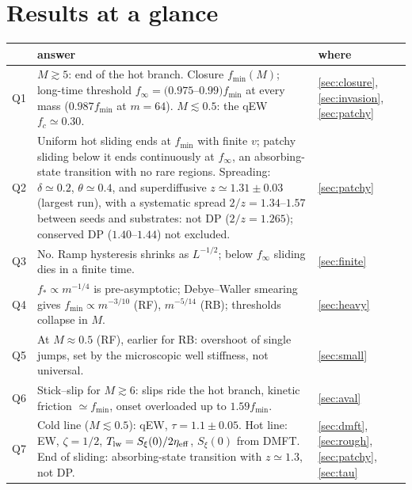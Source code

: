 \documentclass[10pt,a4paper]{article}
\newcommand{\fcs}{f_c}
\begin{document}
\section{Results at a glance}
\label{sec:glance}

\begin{center}\small
\begin{tabular}{p{0.6cm}p{11.2cm}p{2.6cm}}
\toprule
 & answer & where \\
\midrule
Q1 & $M\gtrsim5$: end of the hot branch. Closure $f_{\min}(M)$; long-time threshold $f_\infty=(0.975$--$0.99)f_{\min}$ at every mass ($0.987f_{\min}$ at $m=64$). $M\lesssim0.5$: the qEW $\fcs\simeq0.30$. & \ref{sec:closure}, \ref{sec:invasion}, \ref{sec:patchy} \\
Q2 & Uniform hot sliding ends at $f_{\min}$ with finite $v$; patchy sliding below it ends continuously at $f_\infty$, an absorbing-state transition with no rare regions. Spreading: $\delta\simeq0.2$, $\theta\simeq0.4$, and superdiffusive $z\simeq1.31\pm0.03$ (largest run), with a systematic spread $2/z=1.34$--$1.57$ between seeds and substrates: not DP ($2/z=1.265$); conserved DP ($1.40$--$1.44$) not excluded. & \ref{sec:patchy} \\
Q3 & No. Ramp hysteresis shrinks as $L^{-1/2}$; below $f_\infty$ sliding dies in a finite time. & \ref{sec:finite} \\
Q4 & $f_*\propto m^{-1/4}$ is pre-asymptotic; Debye--Waller smearing gives $f_{\min}\propto m^{-3/10}$ (RF), $m^{-5/14}$ (RB); thresholds collapse in $M$. & \ref{sec:heavy} \\
Q5 & At $M\approx0.5$ (RF), earlier for RB: overshoot of single jumps, set by the microscopic well stiffness, not universal. & \ref{sec:small} \\
Q6 & Stick--slip for $M\gtrsim6$: slips ride the hot branch, kinetic friction $\simeq f_{\min}$, onset overloaded up to $1.59f_{\min}$. & \ref{sec:aval} \\
Q7 & Cold line ($M\lesssim0.5$): qEW, $\tau=1.1\pm0.05$. Hot line: EW, $\zeta=1/2$, $T_{\rm lw}=S_\xi(0)/2\eta_{\rm eff}$, $S_\xi(0)$ from DMFT. End of sliding: absorbing-state transition with $z\simeq1.3$, not DP. & \ref{sec:dmft}, \ref{sec:rough}, \ref{sec:patchy}, \ref{sec:tau} \\
\bottomrule
\end{tabular}
\end{center}
\end{document}
